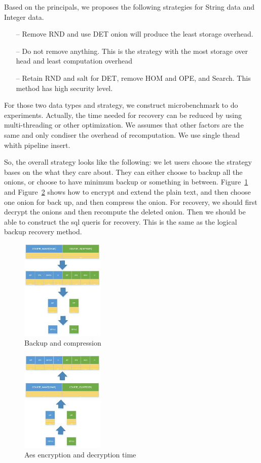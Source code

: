 Based on the principals, we proposes the following strategies for String data and Integer data. 

\begin{itemize}
\item[--] Remove RND and use DET onion will produce the least storage overhead.
\item[--] Do not remove anything. This is the strategy with the most storage over head and least computation overhead
\item[--] Retain RND and salt for DET, remove HOM and OPE, and Search. This method has high security level.
\end{itemize}




For those two data types and strategy, we construct microbenchmark to do experiments. Actually, the time needed for recovery can be reduced by using multi-threading or other optimization. We assumes that other factors are the same and only condiser the overhead of recomputation. We use single thead whith pipeline insert.

So, the overall strategy looks like the following: we let users choose the strategy bases on the what they care about. They can either choose to backup all the onions, or choose to have minimum backup or something in between. Figure~\ref{fig:stack7} and Figure~\ref{fig:stack8} shows how to encrypt and extend the plain text, and then choose one onion for back up, and then compress the onion. For recovery, we should first decrypt the onions and then recompute the deleted onion. Then we should be able to construct the sql queris for recovery. This is the same as the logical backup recovery method.

\begin{figure}[tb]
\centering
\includegraphics[width=4cm]{images/Workflow.jpg}
\caption{Backup and compression}
\label{fig:stack7}
\end{figure}


\begin{figure}[tb]
\centering
\includegraphics[width=4cm]{images/Recovery.jpg}
\caption{Aes encryption and decryption time}
\label{fig:stack8}
\end{figure}
